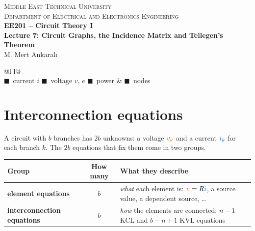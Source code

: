 \documentclass[11pt,a4paper]{article}
\newcommand{\Icol}[1]{\textcolor{ccur}{#1}}
\newcommand{\Vcol}[1]{\textcolor{cvolt}{#1}}
\newcommand{\Pcol}[1]{\textcolor{cpow}{#1}}
\begin{document}
\begin{center}
\begin{tcolorbox}[enhanced, colback=metured!5, colframe=metured, boxrule=1pt,
                  arc=3pt, left=10pt,right=10pt,top=7pt,bottom=7pt, width=\textwidth]
\begin{center}
  {\small\scshape Middle East Technical University}\\[2pt]
  {\small\scshape Department of Electrical and Electronics Engineering}\\[7pt]
  {\Large\bfseries\color{metured} EE201 -- Circuit Theory I}\\[4pt]
  {\large\bfseries Lecture 7: Circuit Graphs, the Incidence Matrix and Tellegen's Theorem}\\[6pt]
  {\small M. Mert Ankaralı}
\end{center}
\end{tcolorbox}
\end{center}
\vspace{-0.5em}

\begin{center}
\small
\begin{tabular}{@{}l l@{}}
\toprule
{}\\
\midrule
\Icol{$\blacksquare$}~current $i$ \quad \Vcol{$\blacksquare$}~voltage $v$, $e$ \quad \Pcol{$\blacksquare$}~power &
\textcolor{metured}{$\blacksquare$}~nodes\\
\bottomrule
\end{tabular}
\end{center}

\section{Interconnection equations}

A circuit with $b$ branches has $2b$ unknowns: a voltage $\Vcol{v_k}$ and a current
$\Icol{i_k}$ for each branch $k$. The $2b$ equations that fix them come in two groups.

\begin{center}
\small
\begin{tabular}{@{}l c p{8.6cm}@{}}
\toprule
\textbf{Group} & \textbf{How many} & \textbf{What they describe}\\
\midrule
\textbf{element equations}        & $b$ & \emph{what} each element is: $\Vcol{v}=R\Icol{i}$,
                                          a source value, a dependent source, \dots\\
\textbf{interconnection equations} & $b$ & \emph{how} the elements are connected:
                                          $n-1$ KCL and $b-n+1$ KVL equations\\
\bottomrule
\end{tabular}
\end{center}
\end{document}
